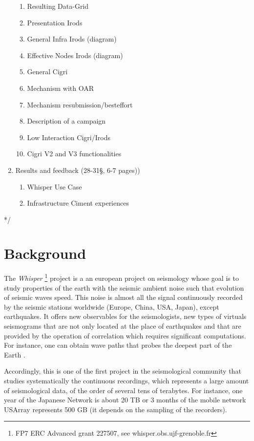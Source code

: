 \documentclass[a4paper, 10pt]{article}
\begin{document}
\begin{multicols}{2}
\begin{enumerate}
\begin{enumerate}
  	  \item Resulting Data-Grid
      \item Presentation Irods
	  \item General Infra Irods (diagram)
	  \item Effective Nodes Irods (diagram)
  	  \item General Cigri
  	  \item Mechanism with OAR
  	  \item Mechanism resubmission/besteffort
  	  \item Description of a campaign
  	  \item Low Interaction Cigri/Irods
  	  \item Cigri V2 and V3 functionalities
  	\end{enumerate}
  \item Results and feedback (28-31\S, 6-7 pages))
      \begin{enumerate}
	    \item Whisper Use Case
        \item Infrastructure Ciment experiences
       \end{enumerate}
\end{enumerate}
*/

\newpage
\section{Background}%

The \emph{Whisper} \footnote{FP7 ERC Advanced grant 227507, see whisper.obs.ujf-grenoble.fr} 
project is a an european project on seismology whose goal is to study properties of the earth
with the seismic ambient noise such that evolution of seismic waves speed. 
This noise is almost all the signal continuously recorded by
the seismic stations worldwide (Europe, China, USA, Japan), except earthquakes. It offers new
observables for the seismologists, new types of virtuals seismograms that are not only located at the 
place of earthquakes and that are provided by the operation of correlation  which requires significant computations.
For instance, one can obtain wave paths that probes the deepest part of the Earth \cite{key:BPCPBR, key:PCP}.

 
Accordingly, this is one of the first project in the seismological community that studies
systematically the continuous recordings, which represents a large amount of seismological data, 
of the order of several tens of terabytes.
For instance, one year of the Japanese Network is about 20 TB or 3 months of the mobile network
USArray represents 500 GB (it depends on the sampling of the recorders).



\end{multicols}
\end{document}
